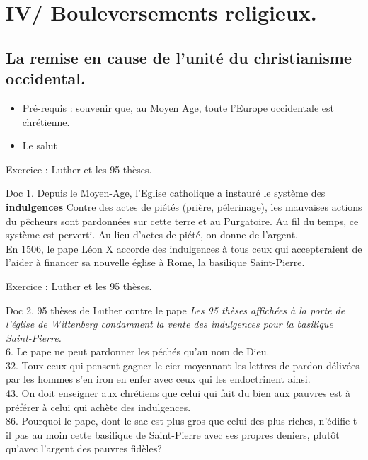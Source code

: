 \documentclass{beamer}
\begin{document}
\begin{frame}

\end{frame}

\section{IV/ Bouleversements religieux.}

\subsection{La remise en cause de l'unité du christianisme occidental.}

\begin{frame}
\begin{itemize}
\item Pré-requis : souvenir que, au Moyen Age, toute l'Europe occidentale est chrétienne.
\item Le salut
\end{itemize}
\end{frame}

\begin{frame}{Exercice : Luther et les 95 thèses.}
\begin{beamerboxesrounded}[scheme=blocimage]{Doc 1. Depuis le Moyen-Age, l'Eglise catholique a instauré le système des \textbf{indulgences}}
 Contre des actes de piétés (prière, pélerinage), les mauvaises actions du pêcheurs sont pardonnées sur cette terre et au Purgatoire. Au fil du temps, ce système est perverti. Au lieu d'actes de piété, on donne de l'argent. \\
En 1506, le pape Léon X accorde des indulgences à tous ceux qui accepteraient de l'aider à financer sa nouvelle église à Rome, la basilique Saint-Pierre. 
\end{beamerboxesrounded}
\end{frame}

\begin{frame}{Exercice : Luther et les 95 thèses.}
\begin{beamerboxesrounded}[scheme=blocimage]{Doc 2. 95 thèses de Luther contre le pape}
\textit{\tiny Les 95 thèses affichées à la porte de l'église de Wittenberg condamnent la vente des indulgences pour la basilique Saint-Pierre.}\\
6. Le pape ne peut pardonner les péchés qu'au nom de Dieu.\\
32. Toux ceux qui pensent gagner le cier moyennant les lettres de pardon délivées par les hommes s'en iron en enfer avec ceux qui les endoctrinent ainsi.\\
43. On doit enseigner aux chrétiens que celui qui fait du bien aux pauvres est à préférer à celui qui achète des indulgences.\\
86. Pourquoi le pape, dont le sac est plus gros que celui des plus riches, n'édifie-t-il pas au moin cette basilique de Saint-Pierre avec ses propres deniers, plutôt qu'avec l'argent des pauvres fidèles?
\end{beamerboxesrounded}
\end{frame}
\end{document}
